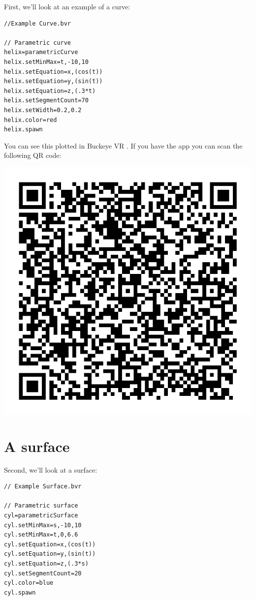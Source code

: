 \documentclass{ximera}
\begin{document}
First, we'll look at an example of a curve:

\begin{verbatim}
//Example Curve.bvr

// Parametric curve
helix=parametricCurve
helix.setMinMax=t,-10,10
helix.setEquation=x,(cos(t))
helix.setEquation=y,(sin(t))
helix.setEquation=z,(.3*t)
helix.setSegmentCount=70
helix.setWidth=0.2,0.2
helix.color=red
helix.spawn
\end{verbatim}

You can see this plotted in Buckeye VR
.
If you have the app you can scan the following QR code:
\begin{image}
\includegraphics{bvrQR1.png}  
\end{image}



\section{A surface}

Second, we'll look at a surface:

\begin{verbatim}
// Example Surface.bvr

// Parametric surface
cyl=parametricSurface
cyl.setMinMax=s,-10,10
cyl.setMinMax=t,0,6.6
cyl.setEquation=x,(cos(t))
cyl.setEquation=y,(sin(t))
cyl.setEquation=z,(.3*s)
cyl.setSegmentCount=20
cyl.color=blue
cyl.spawn
\end{verbatim}
\end{document}
